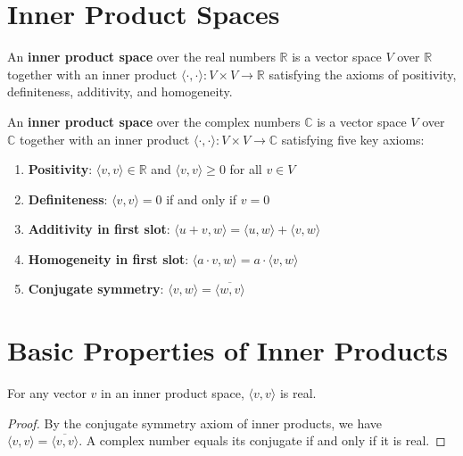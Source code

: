 \section{Inner Product Spaces}

\begin{definition}
  \label{definition : InnerProductSpace_real}
  \leanok
  An \textbf{inner product space} over the real numbers $\mathbb{R}$ is a vector space $V$ over $\mathbb{R}$ together with an inner product $\langle \cdot, \cdot \rangle : V \times V \to \mathbb{R}$ satisfying the axioms of positivity, definiteness, additivity, and homogeneity.
\end{definition}

\begin{definition}
  \label{definition : InnerProductSpace}
  \leanok
  An \textbf{inner product space} over the complex numbers $\mathbb{C}$ is a vector space $V$ over $\mathbb{C}$ together with an inner product $\langle \cdot, \cdot \rangle : V \times V \to \mathbb{C}$ satisfying five key axioms:
  \begin{enumerate}
    \item \textbf{Positivity}: $\langle v, v \rangle \in \mathbb{R}$ and $\langle v, v \rangle \geq 0$ for all $v \in V$
    \item \textbf{Definiteness}: $\langle v, v \rangle = 0$ if and only if $v = 0$
    \item \textbf{Additivity in first slot}: $\langle u + v, w \rangle = \langle u, w \rangle + \langle v, w \rangle$
    \item \textbf{Homogeneity in first slot}: $\langle a \cdot v, w \rangle = a \cdot \langle v, w \rangle$
    \item \textbf{Conjugate symmetry}: $\langle v, w \rangle = \overline{\langle w, v \rangle}$
  \end{enumerate}
\end{definition}

\section{Basic Properties of Inner Products}

\begin{lemma}
  \label{lemma : inner_self_real}
  \leanok
  For any vector $v$ in an inner product space, $\langle v, v \rangle$ is real.
\end{lemma}
\begin{proof}
  By the conjugate symmetry axiom of inner products, we have $\langle v, v \rangle = \overline{\langle v, v \rangle}$. A complex number equals its conjugate if and only if it is real.
\end{proof}

